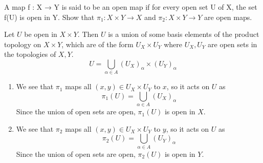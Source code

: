   \begin{exercise}[Munkres 16.4]
    A map f : X → Y is said to be an open map if for every open set U of X, the set f(U) is open in Y. Show that $\pi_1 : X \times Y \to X$ and $\pi_2 : X \times Y \to Y$ are open maps.
  \end{exercise}
  \begin{solution}[Munkres 16.4] 
    Let $U$ be open in $X \times Y$. Then $U$ is a union of some basis elements of the product topology on $X \times Y$, which are of the form $U_X \times U_Y$ where $U_X, U_Y$ are open sets in the topologies of $X, Y$. 
    \begin{equation}
      U = \bigcup_{\alpha \in A} (U_X)_\alpha  \times (U_Y)_\alpha
    \end{equation} 
    \begin{enumerate}
      \item We see that $\pi_1$ maps all $(x, y) \in U_X \times U_Y$ to $x$, so it acts on $U$ as 
      \begin{equation}
        \pi_1(U) = \bigcup_{\alpha \in A} (U_X)_\alpha
      \end{equation} 
      Since the union of open sets are open, $\pi_1 (U)$ is open in $X$. 

      \item We see that $\pi_2$ maps all $(x, y) \in U_X \times U_Y$ to $y$, so it acts on $U$ as 
      \begin{equation}
        \pi_2(U) = \bigcup_{\alpha \in A} (U_Y)_\alpha
      \end{equation} 
      Since the union of open sets are open, $\pi_2 (U)$ is open in $Y$. 
    \end{enumerate}
  \end{solution}

